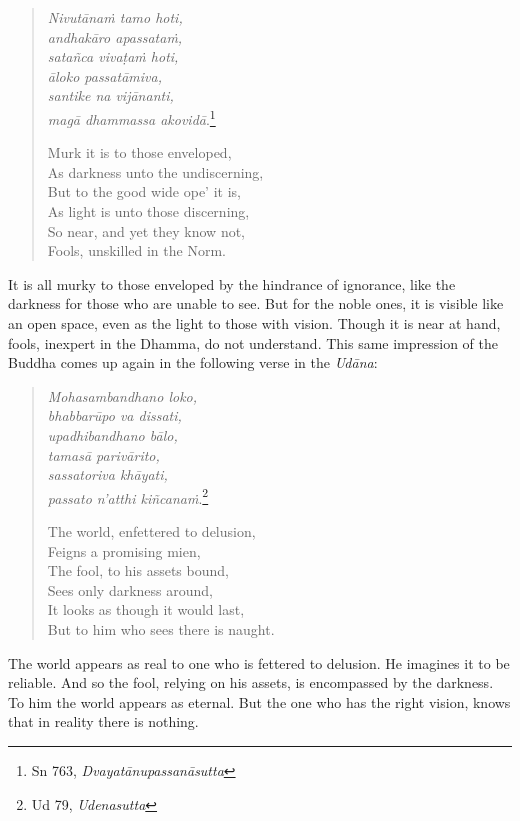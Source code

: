 \begin{quote}
\emph{Nivutānaṁ tamo hoti,}\\
\emph{andhakāro apassataṁ,}\\
\emph{satañca vivaṭaṁ hoti,}\\
\emph{āloko passatāmiva,}\\
\emph{santike na vijānanti,}\\
\emph{magā dhammassa akovidā}.\footnote{Sn 763, \emph{Dvayatānupassanāsutta}}

Murk it is to those enveloped,\\
As darkness unto the undiscerning,\\
But to the good wide ope' it is,\\
As light is unto those discerning,\\
So near, and yet they know not,\\
Fools, unskilled in the Norm.
\end{quote}

It is all murky to those enveloped by the hindrance of ignorance, like the darkness for those who are unable to see. But for the noble ones, it is visible like an open space, even as the light to those with vision. Though it is near at hand, fools, inexpert in the Dhamma, do not understand. This same impression of the Buddha comes up again in the following verse in the \emph{Udāna}:

\begin{quote}
\emph{Mohasambandhano loko,}\\
\emph{bhabbarūpo va dissati,}\\
\emph{upadhibandhano bālo,}\\
\emph{tamasā parivārito,}\\
\emph{sassatoriva khāyati,}\\
\emph{passato n'atthi kiñcanaṁ}.\footnote{Ud 79, \emph{Udenasutta}}

The world, enfettered to delusion,\\
Feigns a promising mien,\\
The fool, to his assets bound,\\
Sees only darkness around,\\
It looks as though it would last,\\
But to him who sees there is naught.
\end{quote}

The world appears as real to one who is fettered to delusion. He imagines it to be reliable. And so the fool, relying on his assets, is encompassed by the darkness. To him the world appears as eternal. But the one who has the right vision, knows that in reality there is nothing.

